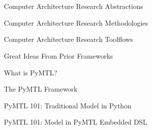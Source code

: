 
\section[{\it Presentation} PyMTL Intro]{}

\begin{frame}{Computer Architecture Research Abstractions}
\end{frame}

\begin{frame}{Computer Architecture Research Methodologies}
\end{frame}

\begin{frame}{Computer Architecture Research Toolflows}
\end{frame}

\begin{frame}{Great Ideas From Prior Frameworks}
\end{frame}

\begin{frame}{What is PyMTL?}
\end{frame}

\begin{frame}{The PyMTL Framework}
\end{frame}

\begin{frame}{PyMTL 101: Traditional Model in Python}
\end{frame}

\begin{frame}{PyMTL 101: Model in PyMTL Embedded DSL}
\end{frame}

